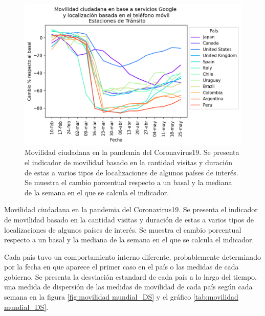 \documentclass{article}
\begin{document}
\begin{figure}[H]
	\centering
	\begin{adjustbox}{width=0.8\textwidth}
			\includegraphics{./mundo_media.png} %
	\end{adjustbox}
	\caption{Movilidad ciudadana en la pandemia del Coronavirus19. Se presenta el indicador de movilidad basado en la cantidad visitas y duración de estas a varios tipos de localizaciones de algunos países de interés. Se muestra el cambio porcentual respecto a un basal y la mediana de la semana en el que se calcula el indicador. }
	\label{fig:movilidad mundial}
\end{figure}


\begin{table}[H]
	\begin{adjustbox}{width=1\textwidth}
	\end{adjustbox}
	\caption{Movilidad ciudadana en la pandemia del Coronavirus19. Se presenta el indicador de movilidad basado en la cantidad visitas y duración de estas a varios tipos de localizaciones de algunos países de interés. Se muestra el cambio porcentual respecto a un basal y la mediana de la semana en el que se calcula el indicador. }
\label{tab:movilidad mundial}
\end{table}


Cada país tuvo un comportamiento interno diferente, probablemente determinado por la fecha en que aparece el primer caso en el país o las medidas de cada gobierno. Se presenta la desviación estandard de cada país a lo largo del tiempo, una medida de dispersión de las medidas de movilidad de cada país según cada semana en la figura \ref{fig:movilidad mundial_DS} y el gráfico \ref{tab:movilidad mundial_DS}.
\end{document}
